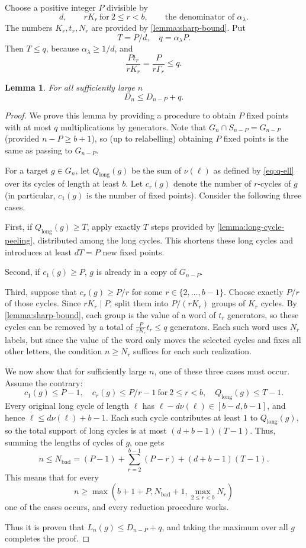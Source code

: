 \documentclass[DIV=12,10pt]{scrartcl}
\newtheorem{lemma}{Lemma}
\theoremstyle{definition}
\begin{document}
Choose a positive integer $P$ divisible by
\[
	d, \qquad rK_r \ \text{for}\ 2\leqslant r<b, \qquad \text{the denominator of $\alpha_\lambda$.}
\]
The numbers $K_r,t_r,N_r$ are provided by \cref{lemma:sharp-bound}. Put
\[
	T=P/d, \quad q=\alpha_\lambda P.
\]
Then $T\leqslant q$, because $\alpha_\lambda\geqslant 1/d$, and
\[
	\frac{P t_r}{r K_r} = \frac{P}{r\Gamma_r} \leqslant q.
\]
\begin{lemma}
	\label{lemma:uniform-upper-recurrence}
	For all sufficiently large $n$
	\[
		D_n \leqslant D_{n-P} + q.
	\]
\end{lemma}
\begin{proof}
We prove this lemma by providing a procedure to obtain $P$ fixed points with at most $q$ multiplications by generators. Note that $G_n \cap S_{n-P} = G_{n-P}$ (provided $n-P\geqslant b+1$), so (up to relabelling) obtaining $P$ fixed points is the same as passing to $G_{n-P}$.

For a target $g\in G_n$, let $Q_\mathrm{long}(g)$ be the sum of $\nu(\ell)$ as defined by \cref{eq:q-ell} over its cycles of length at least $b$. Let $c_r(g)$ denote the number of $r$-cycles of $g$ (in particular, $c_1(g)$ is the number of fixed points). Consider the following three cases.

First, if $Q_\mathrm{long}(g)\geqslant T$, apply exactly $T$ steps provided by \cref{lemma:long-cycle-peeling}, distributed among the long cycles. This shortens these long cycles and introduces at least $dT=P$ new fixed points.

Second, if $c_1(g) \geqslant P$, $g$ is already in a copy of $G_{n-P}$.

Third, suppose that $c_r(g) \geqslant P/r$ for some $r\in\{2,\ldots,b-1\}$. Choose exactly $P/r$ of those cycles. Since $rK_r \mid P$, split them into $P/(rK_r)$ groups of $K_r$ cycles. By \cref{lemma:sharp-bound}, each group is the value of a word of $t_r$ generators, so these cycles can be removed by a total of $\frac{P}{rK_r} t_r \leqslant q$ generators. Each such word uses $N_r$ labels, but since the value of the word only moves the selected cycles and fixes all other letters, the condition $n\geqslant N_r$ suffices for each such realization.

We now show that for sufficiently large $n$, one of these three cases must occur. Assume the contrary:
\[
	c_1(g) \leqslant P-1, \quad c_r(g)\leqslant P/r-1\ \text{for}\ 2\leqslant r < b, \quad Q_\mathrm{long}(g) \leqslant T-1.
\]
Every original long cycle of length $\ell$ has $\ell - d\nu(\ell) \in [b-d,b-1]$, and hence $\ell \leqslant d\nu(\ell)+b-1$. Each such cycle contributes at least $1$ to $Q_\mathrm{long}(g)$, so the total support of long cycles is at most $(d+b-1)(T-1)$. Thus, summing the lengths of cycles of $g$, one gets
\[
	n \leqslant N_\mathrm{bad} = (P-1) + \sum_{r=2}^{b-1} (P-r) + (d+b-1)(T-1).
\]
This means that for every
\[
	n \geqslant \max\left( b+1+P, N_\mathrm{bad}+1, \max_{2\leqslant r < b} N_r \right)
\]
one of the cases occurs, and every reduction procedure works.

Thus it is proven that $L_n(g) \leqslant D_{n-P} + q$, and taking the maximum over all $g$ completes the proof.
\end{proof}
\end{document}

